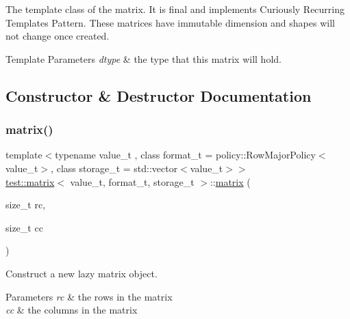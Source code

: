 The template class of the matrix. It is final and implements Curiously Recurring Templates Pattern. These matrices have immutable dimension and shapes will not change once created. 


\begin{DoxyTemplParams}{Template Parameters}
{\em dtype} & the type that this matrix will hold. \\
\hline
\end{DoxyTemplParams}


\subsection{Constructor \& Destructor Documentation}
\mbox{\label{classtest_1_1matrix_a1180d3216a2862c1352abc179ecb9e70}} 
\subsubsection{\texorpdfstring{matrix()}{matrix()}\hspace{0.1cm}{\footnotesize\ttfamily [1/4]}}
{\footnotesize\ttfamily template$<$typename value\+\_\+t , class format\+\_\+t  = policy\+::\+Row\+Major\+Policy$<$value\+\_\+t$>$, class storage\+\_\+t  = std\+::vector$<$value\+\_\+t$>$$>$ \\
\mbox{\hyperlink{classtest_1_1matrix}{test\+::matrix}}$<$ value\+\_\+t, format\+\_\+t, storage\+\_\+t $>$\+::\mbox{\hyperlink{classtest_1_1matrix}{matrix}} (\begin{DoxyParamCaption}\item[{size\+\_\+t}]{rc,  }\item[{size\+\_\+t}]{cc }\end{DoxyParamCaption})\hspace{0.3cm}{\ttfamily [inline]}}



Construct a new lazy matrix object. 


\begin{DoxyParams}{Parameters}
{\em rc} & the rows in the matrix \\
\hline
{\em cc} & the columns in the matrix \\
\hline
\end{DoxyParams}
\mbox{\label{classtest_1_1matrix_ad0412fdd504edcd16c8ad6a0e6a41789}} 
